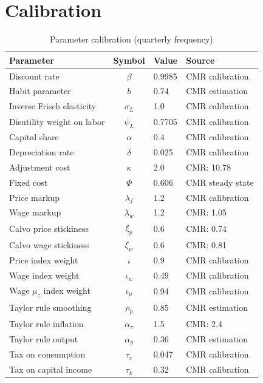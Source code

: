\documentclass[11pt]{article}
\begin{document}
\section{Calibration}
\label{sec:calibration}

\begin{table}[h!]
\centering
\caption{Parameter calibration (quarterly frequency)}
\label{tab:calibration}
\begin{tabular}{lcll}
\toprule
Parameter & Symbol & Value & Source \\
\midrule
Discount rate & $\beta$ & 0.9985 & CMR calibration \\
Habit parameter & $b$ & 0.74 & CMR estimation \\
Inverse Frisch elasticity & $\sigma_L$ & 1.0 & CMR calibration \\
Disutility weight on labor & $\psi_L$ & 0.7705 & CMR calibration \\[3pt]
Capital share & $\alpha$ & 0.4 & CMR calibration \\
Depreciation rate & $\delta$ & 0.025 & CMR calibration \\
Adjustment cost & $\kappa$ & 2.0 & CMR: 10.78 \\
Fixed cost & $\Phi$ & 0.606 & CMR steady state \\[3pt]
Price markup & $\lambda_f$ & 1.2 & CMR calibration \\
Wage markup & $\lambda_w$ & 1.2 & CMR: 1.05 \\
Calvo price stickiness & $\xi_p$ & 0.6 & CMR: 0.74 \\
Calvo wage stickiness & $\xi_w$ & 0.6 & CMR: 0.81 \\
Price index weight & $\iota$ & 0.9 & CMR calibration \\
Wage index weight & $\iota_w$ & 0.49 & CMR calibration \\
Wage $\mu_z$ index weight & $\iota_\mu$ & 0.94 & CMR calibration \\[3pt]
Taylor rule smoothing & $\rho_p$ & 0.85 & CMR estimation \\
Taylor rule inflation & $\alpha_\pi$ & 1.5 & CMR: 2.4 \\
Taylor rule output & $\alpha_y$ & 0.36 & CMR estimation \\[3pt]
Tax on consumption & $\tau_c$ & 0.047 & CMR calibration \\
Tax on capital income & $\tau_k$ & 0.32 & CMR calibration \\

\end{tabular}
\end{table}
\end{document}
